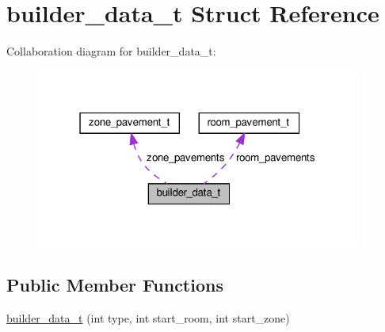 \hypertarget{structbuilder__data__t}{}\section{builder\+\_\+data\+\_\+t Struct Reference}
\label{structbuilder__data__t}


Collaboration diagram for builder\+\_\+data\+\_\+t\+:\nopagebreak
\begin{figure}[H]
\begin{center}
\leavevmode
\includegraphics[width=304pt]{structbuilder__data__t__coll__graph}
\end{center}
\end{figure}
\subsection*{Public Member Functions}
\begin{DoxyCompactItemize}
\item 
\hyperlink{structbuilder__data__t_aa081bbc82b8007a5f62b7540822dcba3}{builder\+\_\+data\+\_\+t} (int type, int start\+\_\+room, int start\+\_\+zone)
\end{DoxyCompactItemize}
